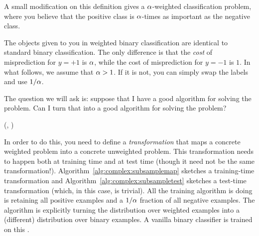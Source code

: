 A small modification on this definition gives a $\al$-weighted
classification problem, where you believe that the positive class is
$\al$-times as important as the negative class.


The objects given to you in weighted binary classification are
identical to standard binary classification.  The only difference is
that the \emph{cost} of misprediction for $y=+1$ is $\al$, while the
cost of misprediction for $y=-1$ is $1$.  In what follows, we assume
that $\alpha > 1$.  If it is not, you can simply swap the labels and use
$1/\alpha$.

The question we will ask is: suppose that I have a good algorithm for
solving the  problem.  Can I turn that
into a good algorithm for solving the  problem?

  {(, \VAR{$\al$})}
  {
\ENDIF
\ENDWHILE
}


In order to do this, you need to define a \emph{transformation} that
maps a concrete weighted problem into a concrete unweighted problem.
This transformation needs to happen both at training time and at test
time (though it need not be the same transformation!).
Algorithm~\ref{alg:complex:subsamplemap} sketches a training-time
 transformation and
Algorithm~\ref{alg:complex:subsampletest} sketches a test-time
transformation (which, in this case, is trivial).  All the training
algorithm is doing is retaining all positive examples and a $1/\alpha$
fraction of all negative examples.  The algorithm is explicitly
turning the distribution over weighted examples into a (different)
distribution over binary examples.  A vanilla binary classifier is
trained on this .

